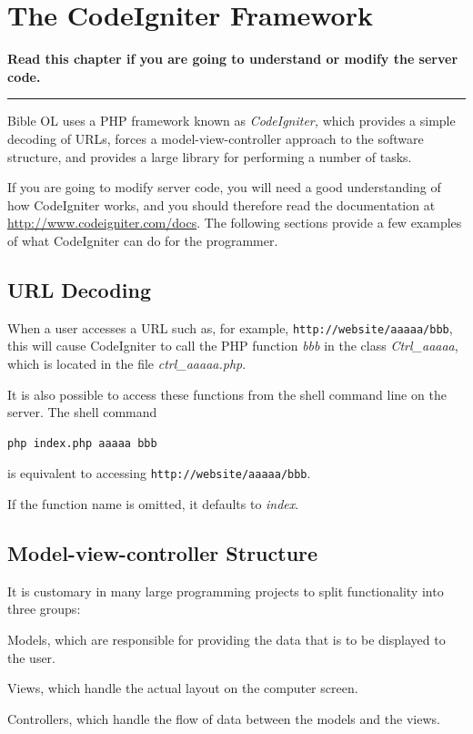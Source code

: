 \documentclass[11pt,oneside,a4paper]{memoir}
\begin{document}
\chapter{The CodeIgniter Framework}\label{codeigniter-use}

\textbf{Read this chapter if you are going to understand or modify the server code.}
\plainbreak{3}

Bible OL uses a PHP framework known as \emph{CodeIgniter,} which provides a simple decoding of URLs,
forces a model-view-controller approach to the software structure, and provides a large library for
performing a number of tasks.

If you are going to modify server code, you will need a good understanding of how CodeIgniter works,
and you should therefore read the documentation at \url{http://www.codeigniter.com/docs}.
The following sections provide a few examples of what CodeIgniter can do for the programmer.

\section{URL Decoding}
\label{url-decoding}

When a user accesses a URL such as, for example, \texttt{http://website/aaaaa/bbb}, this will cause
CodeIgniter to call the PHP function \emph{bbb} in the class \emph{Ctrl\_aaaaa}, which is located in
the file \emph{ctrl\_aaaaa.php}.

It is also possible to access these functions from the shell command line on the server. The shell command

\begin{lstlisting}[language=bash]
php index.php aaaaa bbb
\end{lstlisting}

\noindent
is equivalent to accessing \texttt{http://website/aaaaa/bbb}.

If the function name is omitted, it defaults to \emph{index}.


\section{Model-view-controller Structure}

It is customary in many large programming projects to split functionality into three groups:

\begin{list}{-}{%
    \setlength{\itemsep}{0pt}%
    \setlength{\parsep}{0pt}%
    \setlength{\topsep}{\baselineskip}%
    \setlength{\partopsep}{0pt}%
  }
  \item Models, which are responsible for providing the data that is to be displayed to the user.
  \item Views, which handle the actual layout on the computer screen.
  \item Controllers, which handle the flow of data between the models and the views.
\end{list}
\end{document}
